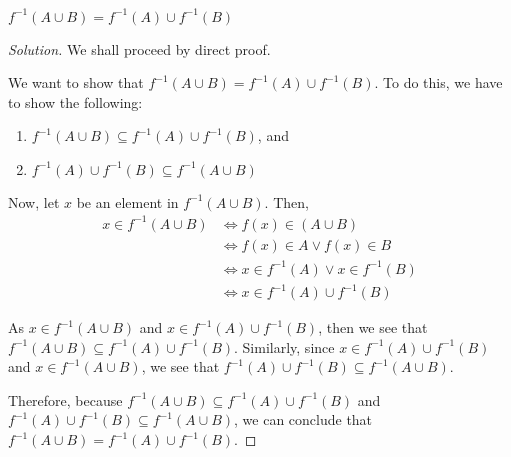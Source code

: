 \documentclass[openany]{book}
\newenvironment{solution}{\begin{proof}[Solution]}{\end{proof}}
\begin{document}
\begin{hw}
	$f^{-1}(A \cup B) = f^{-1}(A) \cup f^{-1}(B)$
\end{hw}
\begin{solution}
	We shall proceed by direct proof.
	
	We want to show that $f^{-1}(A \cup B) = f^{-1}(A) \cup f^{-1}(B)$. To do this, we have to show the following:
	\begin{enumerate}
		\item $f^{-1}(A \cup B) \subseteq f^{-1}(A) \cup f^{-1}(B)$, and
		\item $f^{-1}(A) \cup f^{-1}(B) \subseteq f^{-1}(A \cup B)$
	\end{enumerate} 
	
	Now, let $x$ be an element in $f^{-1}(A \cup B)$. Then,
	\begin{align*}
		x \in f^{-1}(A \cup B) &\iff f(x) \in (A \cup B) \\
		&\iff f(x) \in A \lor f(x) \in B \\
		&\iff x \in f^{-1}(A) \lor x \in f^{-1}(B) \\
		&\iff x \in f^{-1}(A) \cup f^{-1}(B)
	\end{align*}
	
	As $x \in f^{-1}(A \cup B)$ and $x \in f^{-1}(A) \cup f^{-1}(B)$, then we see that $f^{-1}(A \cup B) \subseteq f^{-1}(A) \cup f^{-1}(B)$. Similarly, since $x \in f^{-1}(A) \cup f^{-1}(B)$ and $x \in f^{-1}(A \cup B)$, we see that $f^{-1}(A) \cup f^{-1}(B) \subseteq f^{-1}(A \cup B)$.
	
	Therefore, because $f^{-1}(A \cup B) \subseteq f^{-1}(A) \cup f^{-1}(B)$ and $f^{-1}(A) \cup f^{-1}(B) \subseteq f^{-1}(A \cup B)$, we can conclude that $f^{-1}(A \cup B) = f^{-1}(A) \cup f^{-1}(B)$.
\end{solution}
\end{document}
